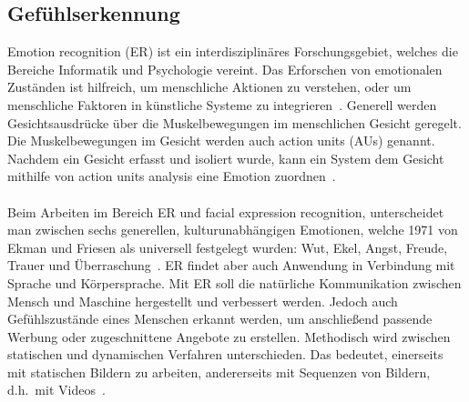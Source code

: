\subsection{Gefühlserkennung}
Emotion recognition (ER) ist ein interdisziplinäres Forschungsgebiet, welches die Bereiche Informatik und Psychologie vereint. Das Erforschen von emotionalen Zuständen ist hilfreich, um menschliche Aktionen zu verstehen, oder um menschliche Faktoren in künstliche Systeme zu integrieren~\cite{eyetrackemotionrec}.
Generell werden Gesichtsausdrücke über die Muskelbewegungen im mensch\-lichen Gesicht geregelt. Die Muskelbewegungen im Gesicht werden auch action units (AUs) genannt. Nachdem ein Gesicht erfasst und isoliert wurde, kann ein System dem Gesicht mithilfe von action units analysis eine Emotion zuordnen~\cite{wildemotionrec}.
\\
\\
Beim Arbeiten im Bereich ER und facial expression recognition, unterscheidet man zwischen sechs generellen, kulturunabhängigen Emotionen, welche 1971 von Ekman und Friesen als universell festgelegt wurden: Wut, Ekel, Angst, Freude, Trauer und Überraschung~\cite{cnnemotionrec}. ER findet aber auch Anwendung in Verbindung mit Sprache und Körpersprache. Mit ER soll die natürliche Kommunikation zwischen Mensch und Maschine hergestellt und verbessert werden. Jedoch auch Gefühlszustände eines Menschen erkannt werden, um anschließend passende Werbung oder zugeschnittene Angebote zu erstellen. Methodisch wird zwischen statischen und dynamischen Verfahren unterschie\-den. Das bedeutet, einerseits mit statischen Bildern zu arbeiten, andererseits mit Sequenzen von Bildern, d.h.~mit Videos~\cite{facialemotionrecusingcnn}.
\\
